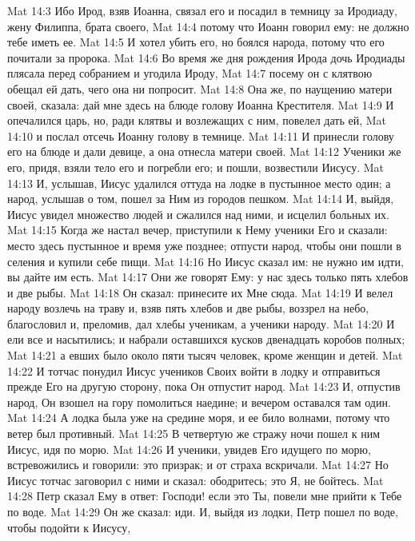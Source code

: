 \vs Mat 14:3 Ибо Ирод, взяв Иоанна, связал его и посадил в темницу за Иродиаду, жену Филиппа, брата своего,
\vs Mat 14:4 потому что Иоанн говорил ему: не должно тебе иметь ее.
\vs Mat 14:5 И хотел убить его, но боялся народа, потому что его почитали за пророка.
\vs Mat 14:6 Во время же  дня рождения Ирода дочь Иродиады плясала перед собранием и угодила Ироду,
\vs Mat 14:7 посему он с клятвою обещал ей дать, чего она ни попросит.
\vs Mat 14:8 Она же, по наущению матери своей, сказала: дай мне здесь на блюде голову Иоанна Крестителя.
\vs Mat 14:9 И опечалился царь, но, ради клятвы и возлежащих с ним, повелел дать ей,
\vs Mat 14:10 и послал отсечь Иоанну голову в темнице.
\vs Mat 14:11 И принесли голову его на блюде и дали девице, а она отнесла матери своей.
\vs Mat 14:12 Ученики же его, придя, взяли тело его и погребли его; и пошли, возвестили Иисусу.
\rsbpar\vs Mat 14:13 И, услышав, Иисус удалился оттуда на лодке в пустынное место один; а народ, услышав о том, пошел за Ним из городов пешком.
\vs Mat 14:14 И, выйдя, Иисус увидел множество людей и сжалился над ними, и исцелил больных их.
\vs Mat 14:15 Когда же настал вечер, приступили к Нему ученики Его и сказали: место здесь пустынное и время уже позднее; отпусти народ, чтобы они пошли в селения и купили себе пищи.
\vs Mat 14:16 Но Иисус сказал им: не нужно им идти, вы дайте им есть.
\vs Mat 14:17 Они же говорят Ему: у нас здесь только пять хлебов и две рыбы.
\vs Mat 14:18 Он сказал: принесите их Мне сюда.
\vs Mat 14:19 И велел народу возлечь на траву и, взяв пять хлебов и две рыбы, воззрел на небо, благословил и, преломив, дал хлебы ученикам, а ученики народу.
\vs Mat 14:20 И ели все и насытились; и набрали оставшихся кусков двенадцать коробов полных;
\vs Mat 14:21 а евших было около пяти тысяч человек, кроме женщин и детей.
\rsbpar\vs Mat 14:22 И тотчас понудил Иисус учеников Своих войти в лодку и отправиться прежде Его на другую сторону, пока Он отпустит народ.
\vs Mat 14:23 И, отпустив народ, Он взошел на гору помолиться наедине; и вечером оставался там один.
\vs Mat 14:24 А лодка была уже на средине моря, и ее било волнами, потому что ветер был противный.
\vs Mat 14:25 В четвертую же стражу ночи пошел к ним Иисус, идя по морю.
\vs Mat 14:26 И ученики, увидев Его идущего по морю, встревожились и говорили: это призрак; и от страха вскричали.
\vs Mat 14:27 Но Иисус тотчас заговорил с ними и сказал: ободритесь; это Я, не бойтесь.
\vs Mat 14:28 Петр сказал Ему в ответ: Господи! если это Ты, повели мне прийти к Тебе по воде.
\vs Mat 14:29 Он же сказал: иди. И, выйдя из лодки, Петр пошел по воде, чтобы подойти к Иисусу,
